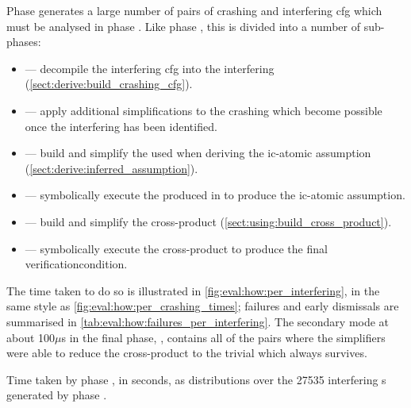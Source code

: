 Phase \subcrash{} generates a large number of pairs of crashing
{\StateMachine} and interfering \gls{cfg} which must be analysed in
phase \subinterfering{}.  Like phase \subcrash{}, this is divided into
a number of sub-phases:
\begin{itemize}
\item {} --- decompile the interfering \gls{cfg} into the
  interfering {\StateMachine} (\autoref{sect:derive:build_crashing_cfg}).
\item {} --- apply additional simplifications to the
  crashing {\StateMachine} which become possible once the interfering
  {\StateMachine} has been identified.
\item {} --- build and simplify the {\StateMachine}
  used when deriving the \gls{ic-atomic} assumption
  (\autoref{sect:derive:inferred_assumption}).
\item {} --- symbolically execute the {\StateMachine}
  produced in  to produce the \gls{ic-atomic}
  assumption.
\item {} --- build and simplify the cross-product
  {\StateMachine} (\autoref{sect:using:build_cross_product}).
\item {} --- symbolically execute the cross-product
  {\StateMachine} to produce the final \gls{verificationcondition}.
\end{itemize}
The time taken to do so is illustrated in
\autoref{fig:eval:how:per_interfering}, in the same style as
\autoref{fig:eval:how:per_crashing_times}; failures and early
dismissals are summarised in
\autoref{tab:eval:how:failures_per_interfering}.  The secondary mode
at about 100$\mu$s in the final phase, , contains
all of the {\StateMachine} pairs where the {\StateMachine} simplifiers
were able to reduce the cross-product {\StateMachine} to the trivial
{\StateMachine} which always survives.

\begin{sanefig}
  \caption{Time taken by phase \subinterfering{}, in seconds, as
    distributions over the 27535 interfering s
    generated by phase \subcrash{}.}
  \label{fig:eval:how:per_interfering}
\end{sanefig}

